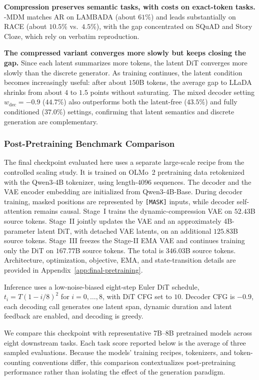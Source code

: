\textbf{\obs{} Compression preserves semantic tasks, with costs on exact-token tasks.} \method-MDM matches AR on LAMBADA (about $61\%$) and leads substantially on RACE (about $10.5\%$ vs.\ $4.5\%$), with the gap concentrated on SQuAD and Story Cloze, which rely on verbatim reproduction.

\textbf{\obs{} The compressed variant converges more slowly but keeps closing the gap.} Since each latent summarizes more tokens, the latent DiT converges more slowly than the discrete generator. As training continues, the latent condition becomes increasingly useful: after about $150$B tokens, the average gap to LLaDA shrinks from about $4$ to $1.5$ points without saturating. The mixed decoder setting $w_{\mathrm{dec}}=-0.9$ ($44.7\%$) also outperforms both the latent-free ($43.5\%$) and fully conditioned ($37.0\%$) settings, confirming that latent semantics and discrete generation are complementary.

\subsubsection{Post-Pretraining Benchmark Comparison}
\label{subsec:exp-pretrained}

The final checkpoint evaluated here uses a separate large-scale recipe from the controlled scaling study. It is trained on OLMo~2 pretraining data retokenized with the Qwen3-4B tokenizer, using length-$4096$ sequences. The decoder and the VAE encoder embedding are initialized from Qwen3-4B-Base. During decoder training, masked positions are represented by \texttt{[MASK]} inputs, while decoder self-attention remains causal. Stage~I trains the dynamic-compression VAE on $52.43$B source tokens. Stage~II jointly updates the VAE and an approximately 4B-parameter latent DiT, with detached VAE latents, on an additional $125.83$B source tokens. Stage~III freezes the Stage-II EMA VAE and continues training only the DiT on $167.77$B source tokens. The total is $346.03$B source tokens. Architecture, optimization, objective, EMA, and state-transition details are provided in Appendix~\ref{app:final-pretraining}.

Inference uses a low-noise-biased eight-step Euler DiT schedule, $t_i=T(1-i/8)^2$ for $i=0,\ldots,8$, with DiT CFG set to $10$. Decoder CFG is $-0.9$, each decoding call generates one latent span, dynamic duration and latent feedback are enabled, and decoding is greedy.

We compare this checkpoint with representative 7B--8B pretrained models across eight downstream tasks. Each \method task score reported below is the average of three sampled evaluations. Because the models' training recipes, tokenizers, and token-counting conventions differ, this comparison contextualizes post-pretraining performance rather than isolating the effect of the generation paradigm.

